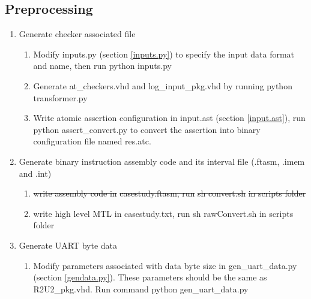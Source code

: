 \documentclass{article}
\theoremstyle{definition}
\begin{document}
\subsection{Preprocessing}
\begin{enumerate}
\item Generate checker associated file
	\begin{enumerate}
		\item Modify \textcolor{green!100}{inputs.py} (section \ref{inputs.py}) to specify the input data format and name, then run \colorbox{blue!30}{python inputs.py }
		\item Generate \textcolor{purple!30}{at\_checkers.vhd} and \textcolor{purple!30}{log\_input\_pkg.vhd} by running \colorbox{blue!30}{python transformer.py}
		\item Write atomic assertion configuration in \textcolor{green!100}{input.ast} (section \ref{input.ast}), run \colorbox{blue!30}{python assert\_convert.py} to convert the assertion into binary configuration file named \textcolor{purple!30}{res.atc}.
	\end{enumerate}
\item Generate binary instruction assembly code and its interval file (.ftasm, .imem and .int)
	\begin{enumerate}
		\item \st{write assembly code in} \textcolor{green!100}{\st{casestudy.ftasm}}\st{, run} \colorbox{blue!30}{\st{sh convert.sh}}\st{ in scripts folder}
		\item write high level MTL in \textcolor{green!100}{casestudy.txt}, run \colorbox{blue!30}{sh rawConvert.sh} in scripts folder
	\end{enumerate}
\item Generate UART byte data
	\begin{enumerate}
		\item Modify parameters associated with data byte size in \textcolor{green!100}{gen\_uart\_data.py} (section \ref{gendata.py}). These parameters should be the same as \textcolor{purple!30}{R2U2\_pkg.vhd}. Run command \colorbox{blue!30}{python gen\_uart\_data.py}
	\end{enumerate}
\end{enumerate}
\end{document}
